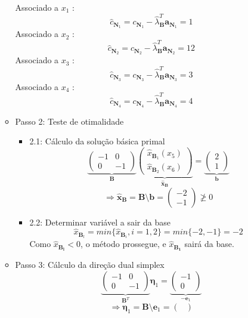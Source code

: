 \documentclass{article}
\begin{document}
\begin{itemize}
\begin{itemize}
Associado a $x_{1}$ :
$$
\hat{c}_{\mathbf{N}_{1}}=c_{\mathbf{N}_{1}}-\hat{\lambda}_{\mathbf{B}}^{T} \mathbf{a}_{\mathbf{N}_{1}}=1
$$
Associado a $x_{2}$ :
$$
\hat{c}_{\mathbf{N}_{2}}=c_{\mathbf{N}_{2}}-\hat{\lambda}_{\mathbf{B}}^{T} \mathbf{a}_{\mathbf{N}_{2}}=12
$$
Associado a $x_{3}$ :
$$
\hat{c}_{\mathbf{N}_{3}}=c_{\mathbf{N}_{3}}-\hat{\lambda}_{\mathbf{B}}^{T} \mathbf{a}_{\mathbf{N}_{3}}=3
$$
Associado a $x_{4}$ :
$$
\hat{c}_{\mathbf{N}_{4}}=c_{\mathbf{N}_{4}}-\hat{\lambda}_{\mathbf{B}}^{T} \mathbf{a}_{\mathbf{N}_{4}}=4
$$
\item Passo 2: Teste de otimalidade
\begin{itemize}
\item 2.1: Cálculo da solução básica primal
\[
\underbrace{
\begin{pmatrix}
-1&0\\
0&-1
\end{pmatrix}}_{\mathbf{B}}
\underbrace{
\begin{pmatrix}
\hat{x}_{\mathbf{B}_1} (x_5)\\
\hat{x}_{\mathbf{B}_2} (x_6)
\end{pmatrix}}_{\mathbf{\hat{x}_\mathbf{B}}}
=
\underbrace{
\begin{pmatrix}
2\\
1
\end{pmatrix}}_{\mathbf{b}}
\]
\[
\Rightarrow \mathbf{\hat{x}_\mathbf{B}} = \mathbf{B} \setminus \mathbf{b} =
\begin{pmatrix}
-2\\
-1
\end{pmatrix}
\ngeq 0
\]
\item 2.2: Determinar variável a sair da base\\
\[
\hat{x}_{\mathbf{B}_l}=min\{ \hat{x}_{\mathbf{B}_i}, i=1,2\}=min\{-2, -1\}=-2
\]
Como $\hat{x}_\mathbf{B_l}<0$, o método prossegue, e $\hat{x}_\mathbf{B_1}$ sairá da base.
		\end{itemize}
		\item Passo 3: Cálculo da direção dual simplex
\[
\underbrace{
\begin{pmatrix}
-1&0\\
0&-1
\end{pmatrix}}_{\mathbf{B}^T}
\mathbf{\eta}_1
=
\underbrace{
\begin{pmatrix}
-1\\
0
\end{pmatrix}}_{-\mathbf{e}_1}
\]
\[
\Rightarrow \mathbf{\eta}_1 = \mathbf{B} \setminus \mathbf{e}_1 =
\begin{pmatrix}

\end{pmatrix}\]
\end{itemize}
\end{itemize}
\end{document}
